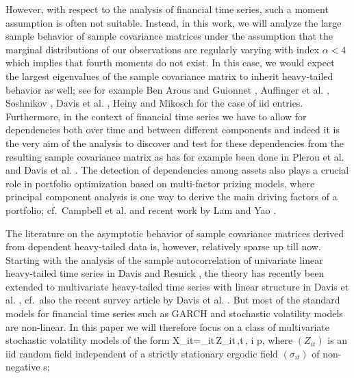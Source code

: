 However, with respect to the analysis of financial time series, such a
moment assumption is often not suitable. Instead, in this work, we
will analyze the large sample behavior of sample covariance matrices
under the assumption that the marginal distributions of our
observations are regularly varying with index $\alpha<4$ which implies
that fourth moments do not exist. In this case, we would expect the
largest eigenvalues of the sample covariance matrix to inherit
heavy-tailed behavior as well; see for example Ben Arous and Guionnet
\cite{arous:guionnet:2008}, 
Auffinger et al. \cite{auffinger:arous:peche:2009}, Soshnikov
\cite{soshnikov:2004,soshnikov:2006}, Davis et
al. \cite{davis:mikosch:heiny:xie:2015}, Heiny and Mikosch
\cite{heiny:mikosch:2016} for the case of iid entries. Furthermore, in
the context of financial time series we have to allow for dependencies
both over time and between different components and indeed it is the
very aim of the analysis to discover and test for these dependencies
from the resulting sample covariance matrix as has for example been done in  
Plerou et al. \cite{plerou:et:al:2002} and Davis et
al. \cite{davis:pfaffel:stelzer:2014,davis:mikosch:pfaffel:2016}. 
The detection of dependencies among assets also plays a crucial role
in portfolio optimization based on multi-factor prizing models, where
principal component analysis is one way to derive the main driving
factors of a portfolio; cf.\ Campbell et
al. \cite{campbell:lo:macKinlay:1997} and recent work by Lam and Yao
\cite{lam:yao:2012}.
\par
The literature on the asymptotic behavior of sample covariance
matrices derived from dependent heavy-tailed data is, however,
relatively sparse up till now. Starting with the analysis of the
sample autocorrelation of univariate linear heavy-tailed time series
in Davis and Resnick \cite{davis:resnick:1985, davis:resnick:1986},  
the theory has recently been extended to multivariate heavy-tailed time series with linear structure in 
Davis et al. \cite{davis:pfaffel:stelzer:2014,davis:mikosch:pfaffel:2016}, cf.\ also the recent 
survey article by Davis et
al. \cite{davis:mikosch:heiny:xie:2015}. But most of the standard
models for financial time series 
such as GARCH and stochastic volatility models
are non-linear. In this paper we will therefore focus on a class of
multivariate stochastic volatility models of the form
\beam\label{Eq:intro:sv}
X_{it}=\sigma_{it}\,Z_{it}\,,\qquad t\in\bbz\,, \leq i \leq p,
\eeam
where $(Z_{it})$ is an iid random field independent of a strictly
stationary ergodic field $(\sigma_{it})$ of non-negative \rv s;
